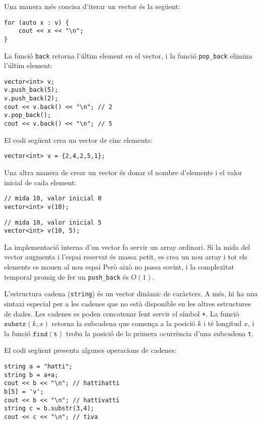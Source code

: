 Una manera més concisa d'iterar un vector és la següent:

\begin{lstlisting}
for (auto x : v) {
    cout << x << "\n";
}
\end{lstlisting}

La funció \texttt{back} retorna l'últim element
en el vector, i la funció \texttt{pop\_back} elimina l'últim element:

\begin{lstlisting}
vector<int> v;
v.push_back(5);
v.push_back(2);
cout << v.back() << "\n"; // 2
v.pop_back();
cout << v.back() << "\n"; // 5
\end{lstlisting}

El codi següent crea un vector de cinc elements:

\begin{lstlisting}
vector<int> v = {2,4,2,5,1};
\end{lstlisting}

Una altra manera de crear un vector és donar el nombre
d'elements i el valor inicial de cada element:

\begin{lstlisting}
// mida 10, valor inicial 0
vector<int> v(10);
\end{lstlisting}
\begin{lstlisting}
// mida 10, valor inicial 5
vector<int> v(10, 5);
\end{lstlisting}

La implementació interna d'un vector
fa servir un array ordinari.
Si la mida del vector augmenta i
l'espai reservat és massa petit,
es crea un nou array i tot
els elements es mouen al nou espai
Però això no passa sovint, i la
complexitat temporal promig de fer un
\texttt{push\_back} és $O(1)$.


L'estructura cadena (\texttt{string})
és un vector dinàmic de caràcters.
A més, hi ha una sintaxi especial per a les cadenes
que no està disponible en les altres estructures de dades.
Les cadenes es poden concatenar fent servir el símbol \texttt{+}.
La funció $\texttt{substr}(k,x)$ retorna la subcadena
que comença a la posició $k$ i té longitud $x$,
i la funció $\texttt{find}(\texttt{t})$ troba la posició
de la primera ocurrència d'una subcadena \texttt{t}.

El codi següent presenta algunes operacions de cadenes:

\begin{lstlisting}
string a = "hatti";
string b = a+a;
cout << b << "\n"; // hattihatti
b[5] = 'v';
cout << b << "\n"; // hattivatti
string c = b.substr(3,4);
cout << c << "\n"; // tiva
\end{lstlisting}

